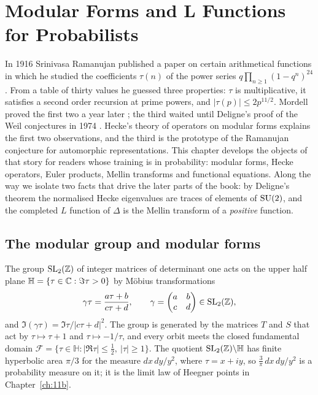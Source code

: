 \chapter{Modular Forms and L Functions for Probabilists}\label{ch:02}

In 1916 Srinivasa Ramanujan published a paper on certain arithmetical functions \cite{ramanujan1916} in which he studied the coefficients $\tau(n)$ of the power series $q\prod_{n\ge1}(1-q^n)^{24}$. From a table of thirty values he guessed three properties: $\tau$ is multiplicative, it satisfies a second order recursion at prime powers, and $|\tau(p)|\le2p^{11/2}$. Mordell proved the first two a year later \cite{mordell1917}; the third waited until Deligne's proof of the Weil conjectures in 1974 \cite{deligne1974}. Hecke's theory of operators on modular forms explains the first two observations, and the third is the prototype of the Ramanujan conjecture for automorphic representations. This chapter develops the objects of that story for readers whose training is in probability: modular forms, Hecke operators, Euler products, Mellin transforms and functional equations. Along the way we isolate two facts that drive the later parts of the book: by Deligne's theorem the normalised Hecke eigenvalues are traces of elements of $\mathrm{SU}(2)$, and the completed $L$ function of $\Delta$ is the Mellin transform of a \emph{positive} function.

\section{The modular group and modular forms}\label{sec:02forms}

The group $\mathrm{SL}_2(\mathbb{Z})$ of integer matrices of determinant one acts on the upper half plane $\mathbb H=\{\tau\in\mathbb{C}:\Im\tau>0\}$ by M\"obius transformations
\[
\gamma\tau=\frac{a\tau+b}{c\tau+d},\qquad\gamma=\begin{pmatrix}a&b\\c&d\end{pmatrix}\in\mathrm{SL}_2(\mathbb{Z}),
\]
and $\Im(\gamma\tau)=\Im\tau/|c\tau+d|^2$. The group is generated by the matrices $T$ and $S$ that act by $\tau\mapsto\tau+1$ and $\tau\mapsto-1/\tau$, and every orbit meets the closed fundamental domain $\mathcal F=\{\tau\in\mathbb H:|\Re\tau|\le\tfrac12,\ |\tau|\ge1\}$. The quotient $\mathrm{SL}_2(\mathbb{Z})\backslash\mathbb H$ has finite hyperbolic area $\pi/3$ for the measure $dx\,dy/y^2$, where $\tau=x+iy$, so $\frac3\pi\,dx\,dy/y^2$ is a probability measure on it; it is the limit law of Heegner points in Chapter~\ref{ch:11b}.

